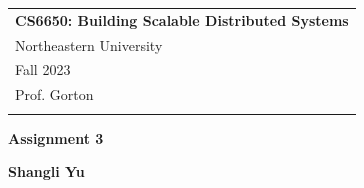 \documentclass[a4paper,12pt]{article} %
\begin{document}



\thispagestyle{empty} %

\begin{tabular}{p{15.5cm}} %
{\large \bf CS6650: Building Scalable Distributed Systems} \\
Northeastern University \\ Fall 2023  \\ Prof. Gorton\\
\hline %
\\
\end{tabular} %

\vspace*{0.3cm} %

\begin{center} %
	{\Large \bf Assignment 3} %
	\vspace{2mm}
	
	{\bf Shangli Yu} %
		
\end{center}  

\vspace{0.4cm}


\end{document}

